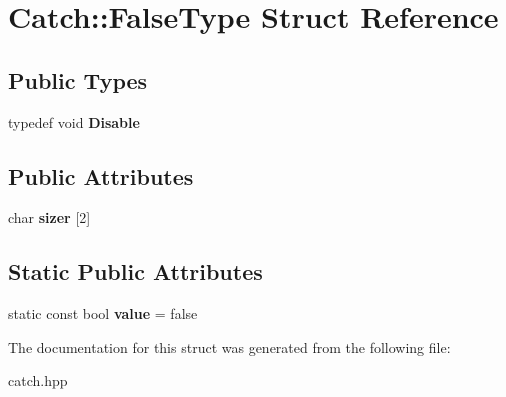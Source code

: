 \hypertarget{structCatch_1_1FalseType}{
\section{Catch::FalseType Struct Reference}
\label{structCatch_1_1FalseType}
}
\subsection*{Public Types}
\begin{DoxyCompactItemize}
\item 
\hypertarget{structCatch_1_1FalseType_a9b1d652f081c774bdaea5d061bb3372c}{
typedef void {\bfseries Disable}}
\label{structCatch_1_1FalseType_a9b1d652f081c774bdaea5d061bb3372c}

\end{DoxyCompactItemize}
\subsection*{Public Attributes}
\begin{DoxyCompactItemize}
\item 
\hypertarget{structCatch_1_1FalseType_ad0a0468edb767e93e12459b816a89a88}{
char {\bfseries sizer} \mbox{[}2\mbox{]}}
\label{structCatch_1_1FalseType_ad0a0468edb767e93e12459b816a89a88}

\end{DoxyCompactItemize}
\subsection*{Static Public Attributes}
\begin{DoxyCompactItemize}
\item 
\hypertarget{structCatch_1_1FalseType_a34974ab2e06c898a360ba5f3b2d9ebe3}{
static const bool {\bfseries value} = false}
\label{structCatch_1_1FalseType_a34974ab2e06c898a360ba5f3b2d9ebe3}

\end{DoxyCompactItemize}


The documentation for this struct was generated from the following file:\begin{DoxyCompactItemize}
\item 
catch.hpp\end{DoxyCompactItemize}
